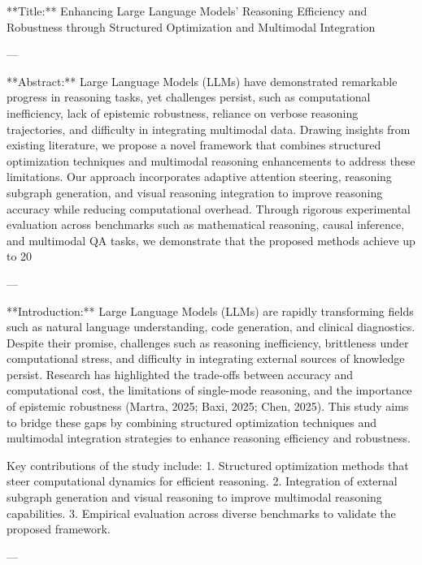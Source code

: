 **Title:**  
Enhancing Large Language Models' Reasoning Efficiency and Robustness through Structured Optimization and Multimodal Integration  

---

**Abstract:**  
Large Language Models (LLMs) have demonstrated remarkable progress in reasoning tasks, yet challenges persist, such as computational inefficiency, lack of epistemic robustness, reliance on verbose reasoning trajectories, and difficulty in integrating multimodal data. Drawing insights from existing literature, we propose a novel framework that combines structured optimization techniques and multimodal reasoning enhancements to address these limitations. Our approach incorporates adaptive attention steering, reasoning subgraph generation, and visual reasoning integration to improve reasoning accuracy while reducing computational overhead. Through rigorous experimental evaluation across benchmarks such as mathematical reasoning, causal inference, and multimodal QA tasks, we demonstrate that the proposed methods achieve up to 20%

---

**Introduction:**  
Large Language Models (LLMs) are rapidly transforming fields such as natural language understanding, code generation, and clinical diagnostics. Despite their promise, challenges such as reasoning inefficiency, brittleness under computational stress, and difficulty in integrating external sources of knowledge persist. Research has highlighted the trade-offs between accuracy and computational cost, the limitations of single-mode reasoning, and the importance of epistemic robustness (Martra, 2025; Baxi, 2025; Chen, 2025). This study aims to bridge these gaps by combining structured optimization techniques and multimodal integration strategies to enhance reasoning efficiency and robustness.

Key contributions of the study include:  
1. Structured optimization methods that steer computational dynamics for efficient reasoning.  
2. Integration of external subgraph generation and visual reasoning to improve multimodal reasoning capabilities.  
3. Empirical evaluation across diverse benchmarks to validate the proposed framework.

---

